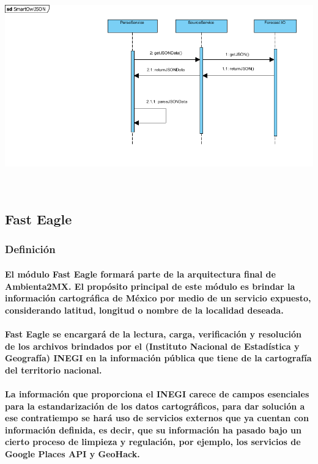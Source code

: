     \begin{center}
      \includegraphics[width=14cm,height=9cm]{./images/SmartOwlSequenceDiagram2}
    \end{center}
  \subsection{Fast Eagle}
    \subsubsection{Definición}
      \paragraph{El módulo Fast Eagle formará parte de la arquitectura final de Ambienta2MX. El propósito principal de este módulo es brindar la información cartográfica de México por medio de un servicio expuesto, considerando latitud, longitud o nombre de la localidad deseada.}
      \paragraph{Fast Eagle se encargará de la lectura, carga, verificación y resolución de los archivos brindados por el (Instituto Nacional de Estadística y Geografía) INEGI en la información pública que tiene de la cartografía del territorio nacional.}
      \paragraph{La información que proporciona el INEGI carece de campos esenciales para la estandarización de los datos cartográficos, para dar solución a ese contratiempo se hará uso de servicios externos que ya cuentan con información definida, es decir, que su información ha pasado bajo un cierto proceso de limpieza y regulación, por ejemplo, los servicios de Google Places API y GeoHack.}

